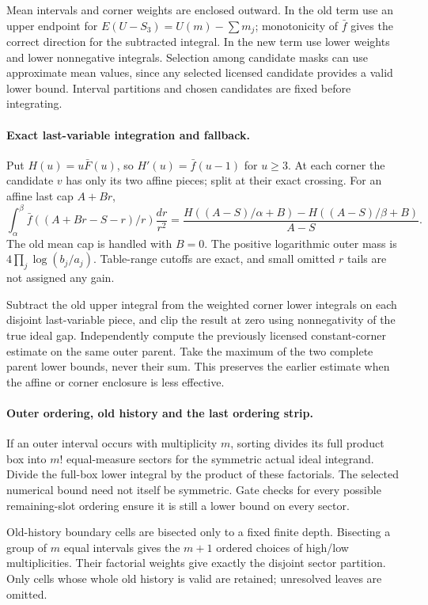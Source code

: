 Mean intervals and corner weights are enclosed outward. In the old
term use an upper endpoint for
$E(U-S_3)=U(m)-\sum m_j$; monotonicity of $\bar f$ gives the correct
direction for the subtracted integral. In the new term use lower
weights and lower nonnegative integrals. Selection among candidate
masks can use approximate mean values, since any selected licensed
candidate provides a valid lower bound. Interval partitions and
chosen candidates are fixed before integrating.

\paragraph{Exact last-variable integration and fallback.}
Put $H(u)=u\bar F(u)$, so $H'(u)=\bar f(u-1)$ for $u\ge3$.
At each corner the candidate $v$ has only its two affine pieces;
split at their exact crossing. For an affine last cap $A+Br$,
\[
 \int_\alpha^\beta \bar f((A+Br-S-r)/r)\frac{dr}{r^2}
 =\frac{H((A-S)/\alpha+B)-H((A-S)/\beta+B)}{A-S}.
\]
The old mean cap is handled with $B=0$. The positive logarithmic
outer mass is $4\prod_j\log(b_j/a_j)$. Table-range cutoffs are
exact, and small omitted $r$ tails are not assigned any gain.

Subtract the old upper integral from the weighted corner lower
integrals on each disjoint last-variable piece, and clip the result
at zero using nonnegativity of the true ideal gap. Independently
compute the previously licensed constant-corner estimate on the
same outer parent. Take the maximum of the two complete parent
lower bounds, never their sum. This preserves the earlier estimate
when the affine or corner enclosure is less effective.

\paragraph{Outer ordering, old history and the last ordering strip.}
If an outer interval occurs with multiplicity $m$, sorting divides
its full product box into $m!$ equal-measure sectors for the symmetric
actual ideal integrand. Divide the full-box lower integral by the
product of these factorials. The selected numerical bound need not
itself be symmetric. Gate checks for every possible remaining-slot
ordering ensure it is still a lower bound on every sector.

Old-history boundary cells are bisected only to a fixed finite depth.
Bisecting a group of $m$ equal intervals gives the $m+1$ ordered
choices of high/low multiplicities. Their factorial weights give
exactly the disjoint sector partition. Only cells whose whole old
history is valid are retained; unresolved leaves are omitted.

